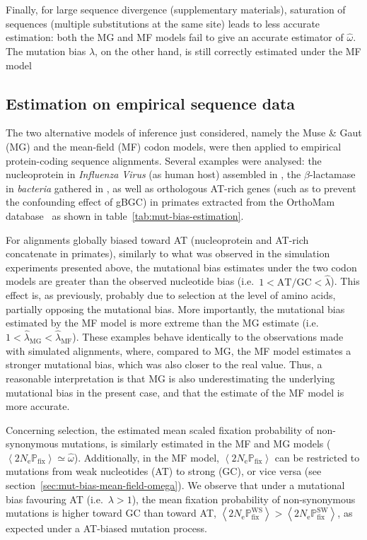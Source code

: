 \documentclass{article}
\newcommand{\Ne}{N_{\text{e}}}
\newcommand{\proba}{\mathbb{P}}
\newcommand{\Pfix}{2 \Ne \proba_{\text{fix}}}
\newcommand{\atgc}{\text{AT/GC}}
\newcommand{\avgpfix}{\left\langle \Pfix \right\rangle }
\newcommand{\avgpfixATtoGC}{\left\langle \Pfix^{\text{WS}} \right\rangle }
\newcommand{\avgpfixGCtoAT}{\left\langle \Pfix^{\text{SW}} \right\rangle }
\begin{document}
Finally, for large sequence divergence (supplementary materials), saturation of sequences (multiple substitutions at the same site) leads to less accurate estimation: both the MG and MF models fail to give an accurate estimator of $\widehat{\omega}$.
The mutation bias $\widehat{\lambda}$, on the other hand, is still correctly estimated under the MF model

\subsection{Estimation on empirical sequence data}
\label{subsec:estimation-of-empirical-sequence-data}

The two alternative models of inference just considered, namely the Muse \& Gaut ({MG}) and the mean-field ({MF}) codon models, were then applied to empirical protein-coding sequence alignments.
Several examples were analysed: the nucleoprotein in \textit{Influenza Virus} (as human host) assembled in \citet{Bloom2017}, the $\beta$-lactamase in \textit{bacteria} gathered in \citet{Bloom2014}, as well as orthologous AT-rich genes (such as to prevent the confounding effect of gBGC) in primates extracted from the OrthoMam database~\citep{Scornavacca2019} as shown in table~\ref{tab:mut-bias-estimation}.

For alignments globally biased toward AT (nucleoprotein and AT-rich concatenate in primates), similarly to what was observed in the simulation experiments presented above, the mutational bias estimates under the two codon models are greater than the observed nucleotide bias (i.e.~$1 < \atgc < \widehat{\lambda}$).
This effect is, as previously, probably due to selection at the level of amino acids, partially opposing the mutational bias.
More importantly, the mutational bias estimated by the {MF} model is more extreme than the {MG} estimate (i.e.~$1 < \widehat{\lambda}_{\text{{MG}}} < \widehat{\lambda}_{\text{{MF}}}$).
These examples behave identically to the observations made with simulated alignments, where, compared to {MG}, the {MF} model estimates a stronger mutational bias, which was also closer to the real value.
Thus, a reasonable interpretation is that {MG} is also underestimating the underlying mutational bias in the present case, and that the estimate of the {MF} model is more accurate.

Concerning selection, the estimated mean scaled fixation probability of {non-synonymous} mutations, is similarly estimated in the {MF} and {MG} models ($\avgpfix \simeq \widehat{\omega}$).
Additionally, in the {MF} model, $\avgpfix$ can be restricted to mutations from weak nucleotides (AT) to strong (GC), or vice versa (see section~\ref{sec:mut-bias-mean-field-omega}).
We observe that under a mutational bias favouring AT (i.e.~$\lambda > 1$), the mean fixation probability of {non-synonymous} mutations is higher toward GC than toward AT, $\avgpfixATtoGC > \avgpfixGCtoAT$, as expected under a AT-biased mutation process.
\end{document}
